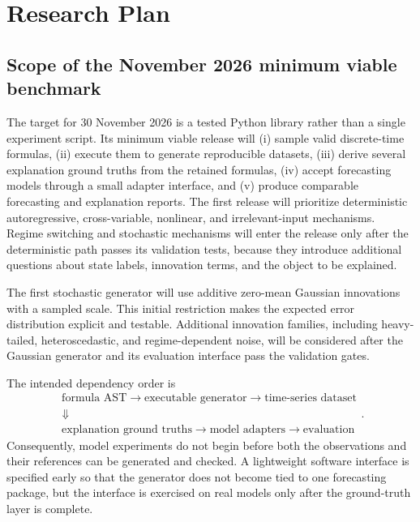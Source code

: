 \section{Research Plan}

\subsection{Scope of the November 2026 minimum viable benchmark}

The target for 30 November 2026 is a tested Python library rather than a
single experiment script. Its minimum viable release will (i) sample valid
discrete-time formulas, (ii) execute them to generate reproducible datasets,
(iii) derive several explanation ground truths from the retained formulas,
(iv) accept forecasting models through a small adapter interface, and
(v) produce comparable forecasting and explanation reports. The first release
will prioritize deterministic autoregressive, cross-variable, nonlinear, and
irrelevant-input mechanisms. Regime switching and stochastic mechanisms will
enter the release only after the deterministic path passes its validation
tests, because they introduce additional questions about state labels,
innovation terms, and the object to be explained.

The first stochastic generator will use additive zero-mean Gaussian
innovations with a sampled scale. This initial restriction makes the expected
error distribution explicit and testable. Additional innovation families,
including heavy-tailed, heteroscedastic, and regime-dependent noise, will be
considered after the Gaussian generator and its evaluation interface pass the
validation gates.

The intended dependency order is
\[
\boxed{
\begin{gathered}
\text{formula AST}
\longrightarrow
\text{executable generator}
\longrightarrow
\text{time-series dataset}
\\[1mm]
\Downarrow
\\[1mm]
\text{explanation ground truths}
\longrightarrow
\text{model adapters}
\longrightarrow
\text{evaluation}
\end{gathered}
}.
\]
Consequently, model experiments do not begin before both the observations and
their references can be generated and checked. A lightweight software
interface is specified early so that the generator does not become tied to one
forecasting package, but the interface is exercised on real models only after
the ground-truth layer is complete.

